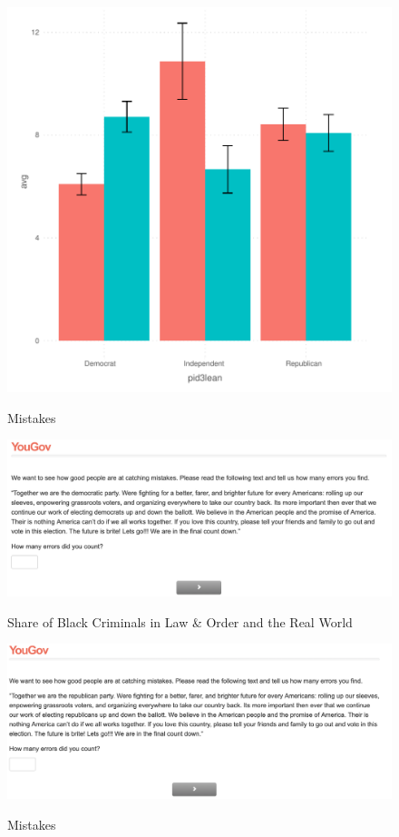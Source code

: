 \documentclass[12pt, letterpaper]{article}
\begin{document}
\begin{figure}[!htbp]
\centering
\caption{Mistakes}
\includegraphics[scale=.6]{../figs/parking.pdf}
\label{fig:mistakes_rep}
\end{figure}


\clearpage



\begin{figure}[!htbp]
\centering
\caption{Share of Black Criminals in Law \& Order and the Real World}
\includegraphics[scale=.4]{../data/treats/Mistakes_Dem.png}
\label{fig:mistakes_dem}
\end{figure}

\begin{figure}[!htbp]
\centering
\caption{Mistakes}
\includegraphics[scale=.4]{../data/treats/Mistakes_Rep.png}
\label{fig:mistakes_rep}
\end{figure}
\end{document}
